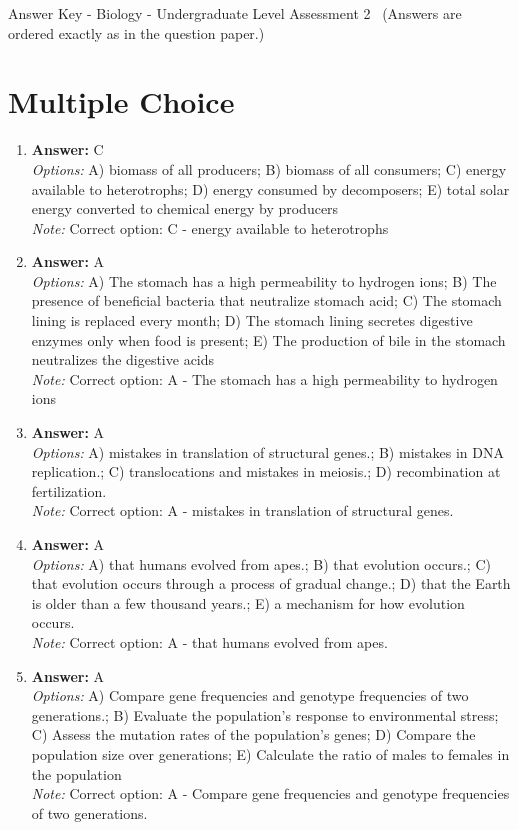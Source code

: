 \documentclass[12pt]{article}
\begin{document}
\begin{center}
Answer Key - Biology - Undergraduate Level Assessment 2 \
\small (Answers are ordered exactly as in the question paper.)
\end{center}

\section*{Multiple Choice}
\begin{enumerate}[label=\arabic*.]
\item \textbf{Answer:} C
\\ \textit{Options:} A) biomass of all producers; B) biomass of all consumers; C) energy available to heterotrophs; D) energy consumed by decomposers; E) total solar energy converted to chemical energy by producers
\\ \textit{Note:} Correct option: C - energy available to heterotrophs
\item \textbf{Answer:} A
\\ \textit{Options:} A) The stomach has a high permeability to hydrogen ions; B) The presence of beneficial bacteria that neutralize stomach acid; C) The stomach lining is replaced every month; D) The stomach lining secretes digestive enzymes only when food is present; E) The production of bile in the stomach neutralizes the digestive acids
\\ \textit{Note:} Correct option: A - The stomach has a high permeability to hydrogen ions
\item \textbf{Answer:} A
\\ \textit{Options:} A) mistakes in translation of structural genes.; B) mistakes in DNA replication.; C) translocations and mistakes in meiosis.; D) recombination at fertilization.
\\ \textit{Note:} Correct option: A - mistakes in translation of structural genes.
\item \textbf{Answer:} A
\\ \textit{Options:} A) that humans evolved from apes.; B) that evolution occurs.; C) that evolution occurs through a process of gradual change.; D) that the Earth is older than a few thousand years.; E) a mechanism for how evolution occurs.
\\ \textit{Note:} Correct option: A - that humans evolved from apes.
\item \textbf{Answer:} A
\\ \textit{Options:} A) Compare gene frequencies and genotype frequencies of two generations.; B) Evaluate the population's response to environmental stress; C) Assess the mutation rates of the population's genes; D) Compare the population size over generations; E) Calculate the ratio of males to females in the population
\\ \textit{Note:} Correct option: A - Compare gene frequencies and genotype frequencies of two generations.
\end{enumerate}
\end{document}

